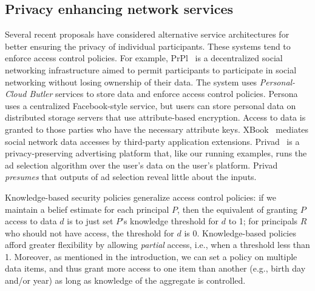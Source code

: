 \subsection{Privacy enhancing network services}
Several recent proposals have considered alternative service
architectures for better ensuring the privacy of individual
participants.  These systems tend to enforce access control policies.
%
For example, PrPl~\cite{prpl} is a decentralized social networking
infrastructure aimed to permit participants to participate in social
networking without losing ownership of their data.  The system uses
\emph{Personal-Cloud Butler} services to store data and enforce access
control policies.  Persona~\cite{persona} uses a centralized
Facebook-style service, but users can store personal data on
distributed storage servers that use attribute-based encryption.
Access to data is granted to those parties who have the necessary
attribute keys.  XBook~\cite{xbook} mediates social network data
accesses by third-party application extensions.  Privad~\cite{privad}
is a privacy-preserving advertising platform that, like our running
examples, runs the ad selection algorithm over the user's data on the
user's platform.  Privad \emph{presumes} that outputs of ad selection
reveal little about the inputs.

Knowledge-based security policies generalize access control policies:
if we maintain a belief estimate for each principal $P$, then the
equivalent of granting $P$ access to data $d$ is to just set $P$'s
knowledge threshold for $d$ to 1; for principals $R$ who should not
have access, the threshold for $d$ is 0.  Knowledge-based policies
afford greater flexibility by allowing \emph{partial} access, i.e.,
when a threshold less than 1.  Moreover, as mentioned in the
introduction, we can set a policy on multiple data items, and thus
grant more access to one item than another (e.g., birth day and/or
year) as long as knowledge of the aggregate is controlled.

